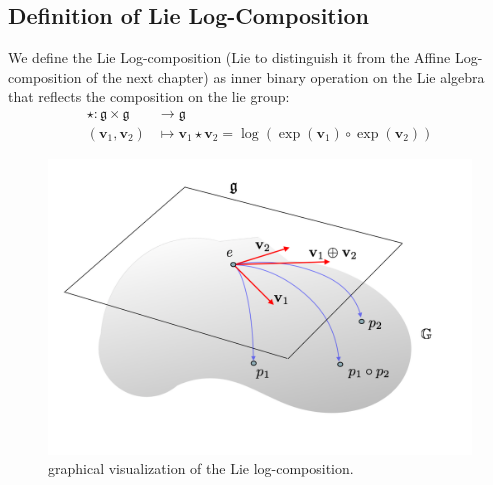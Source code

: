 \subsection{Definition of Lie Log-Composition}

We define the Lie Log-composition (Lie to distinguish it from the Affine Log-composition of the next chapter) as inner binary operation on the Lie algebra that reflects the composition on the lie group:
\begin{align*}
\star : \mathfrak{g} \times \mathfrak{g} & \longrightarrow \mathfrak{g}    \\
(\mathbf{v}_{1}, \mathbf{v}_{2}) &\longmapsto \mathbf{v}_{1}\star \mathbf{v}_{2} =  \log(\exp(\mathbf{v}_1)\circ \exp(\mathbf{v}_2))
\end{align*}

 \begin{figure}[!ht]
 	\centering
 	\includegraphics[scale=0.35]{figures/log_composition.png}
 	\caption{graphical visualization of the Lie log-composition.}
 	\label{fig:composition}
 \end{figure}

